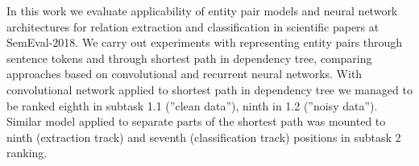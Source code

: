 In this work we evaluate applicability of entity pair models and neural network architectures for relation extraction and classification in scientific papers at SemEval-2018. We carry out experiments with representing entity pairs through sentence tokens and through shortest path in dependency tree, comparing approaches based on convolutional and recurrent neural networks. With convolutional network applied to shortest path in dependency tree we managed to be ranked eighth in subtask 1.1 (''clean data''), ninth in 1.2 (''noisy data''). Similar model applied to separate parts of the shortest path was mounted to ninth (extraction track) and seventh (classification track) positions in subtask 2 ranking.
